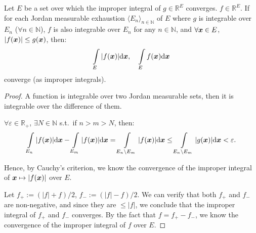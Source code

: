 \documentclass[openany]{book}
\begin{document}
\begin{theorem}
	\label{theorem: comparision criterion (improper integral)}
	Let $E$ be a set over which the improper integral of $g \in \mathbb R^E$ converges. 
	$f \in \mathbb R^E$.
	If for each Jordan measurable exhaustion $\langle E_n \rangle_{n \in \mathbb N}$ of $E$ where $g$ is integrable over $E_n$ ($\forall n \in \mathbb N$), $f$ is also integrable over $E_n$ for any $n \in \mathbb N$, and $\forall \boldsymbol{x} \in E$, $|f(\boldsymbol{x})| \leq g(\boldsymbol{x})$, then:
	\begin{equation*}
		\int\limits_{E} |f(\boldsymbol{x})| \mathrm{d} \boldsymbol{x}, \quad \int\limits_{E} f(\boldsymbol{x}) \mathrm{d} \boldsymbol{x}
	\end{equation*}
	converge (as improper integrals).
\end{theorem}
\begin{proof}
	A function is integrable over two Jordan measurable sets, then it is integrable over the difference of them.

	$\forall \varepsilon \in \mathbb R_+$, $\exists N \in \mathbb N$ s.t.\ if $n > m > N$, then:
	\begin{equation*}
		\int\limits_{E_n} |f(\boldsymbol{x})| \mathrm{d} \boldsymbol{x} - \int\limits_{E_m} |f(\boldsymbol{x})| \mathrm{d} \boldsymbol{x} = \int\limits_{E_n \backslash E_m} |f(\boldsymbol{x})| \mathrm{d} \boldsymbol{x}
		\leq \int\limits_{E_n \backslash E_m} |g(\boldsymbol{x})| \mathrm{d} \boldsymbol{x} < \varepsilon.
	\end{equation*}

	Hence, by Cauchy's criterion, we know the convergence of the improper integral of $\boldsymbol{x} \mapsto |f(\boldsymbol{x})|$ over $E$.

	Let $f_+ := (|f| + f)/2$, $f_- := (|f| - f)/2$. 
	We can verify that both $f_+$ and $f_-$ are non-negative, and since they are $\leq |f|$, we conclude that the improper integral of $f_+$ and $f_-$ converges. 
	By the fact that $f = f_+ - f_-$, we know the convergence of the improper integral of $f$ over $E$.
\end{proof}
\end{document}
